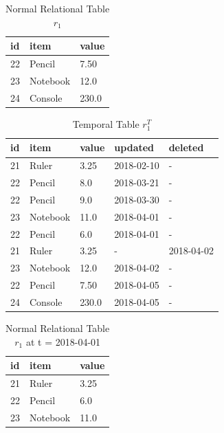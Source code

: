 \begin{center}
\begin{table}[t]
	\centering
	\caption{Normal Relational Table $r_1$}
	\label{table:normal_table_2}
	\begin{tabular}{p{4cm}p{4cm}p{4cm}}
		\hline
		id & item      & value  \\ \hline
		22 & Pencil    & 7.50 \\
		23 & Notebook & 12.0   \\ 
		24 & Console & 230.0 \\ \hline
	\end{tabular}
\end{table}

\begin{table}[t]
	\centering
	\caption{Temporal Table $r_1^T$}
	\label {table:temporal_table_2}
	\begin{tabular}{p{1cm}p{2cm}p{3cm}p{3cm}p{2cm}}
		\hline
		id & item      & value  & updated  & deleted\\ \hline
		21 & Ruler    & 3.25  & 2018-02-10  &  - \\  
		22 & Pencil    & 8.0  & 2018-03-21  &  - \\
		22 & Pencil    & 9.0  & 2018-03-30  &  -\\
		23 & Notebook & 11.0  & 2018-04-01 & - \\
		22 & Pencil & 6.0  & 2018-04-01 & - \\
		21 & Ruler    & 3.25  & -  &  2018-04-02 \\
		23 & Notebook & 12.0  & 2018-04-02 & - \\ 
		22 & Pencil & 7.50  & 2018-04-05 & - \\ 
		24 & Console & 230.0  & 2018-04-05 & - \\ \hline
	\end{tabular}
\end{table}
\end{center}
\begin{center}
\begin{table}
	\centering
	\caption{Normal Relational Table $r_1$ at t = 2018-04-01}
	\label{table:normal_table_2_t}
	\begin{tabular}{p{4cm}p{4cm}p{4cm}}
		\hline
		id & item  & value  \\ \hline
		21 & Ruler & 3.25 \\
		22 & Pencil & 6.0   \\ 
		23 & Notebook & 11.0 \\ \hline
	\end{tabular}
\end{table}
\end{center}

